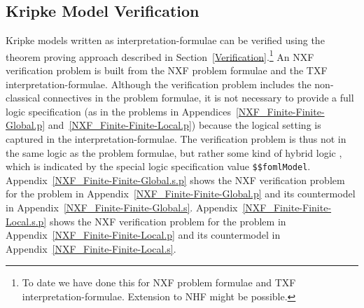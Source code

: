 \documentclass{easychair}
\begin{document}
\subsection{Kripke Model Verification}
\label{KripkeVerification}

Kripke models written as interpretation-formulae can be verified using the theorem proving 
approach described in Section~\ref{Verification}.\footnote{%
To date we have done this for NXF problem formulae and TXF interpretation-formulae. 
Extension to NHF might be possible.}
An NXF verification problem is built from the NXF problem formulae and the TXF 
interpretation-formulae.
Although the verification problem includes the non-classical connectives in the problem
formulae, it is not necessary to provide a full logic specification (as in the problems in
Appendices~\ref{NXF_Finite-Finite-Global.p} and~\ref{NXF_Finite-Finite-Local.p}) because the
logical setting is captured in the interpretation-formulae.
The verification problem is thus not in the same logic as the problem formulae, but rather
some kind of hybrid logic \cite{Bra11}, which is indicated by the special logic specification
value {\tt \$\$fomlModel}.
Appendix~\ref{NXF_Finite-Finite-Global.s.p} shows the NXF verification problem for the problem
in Appendix~\ref{NXF_Finite-Finite-Global.p} and its countermodel in
Appendix~\ref{NXF_Finite-Finite-Global.s}.
Appendix~\ref{NXF_Finite-Finite-Local.s.p} shows the NXF verification problem for the problem
in Appendix~\ref{NXF_Finite-Finite-Local.p} and its countermodel in
Appendix~\ref{NXF_Finite-Finite-Local.s}.
\end{document}
